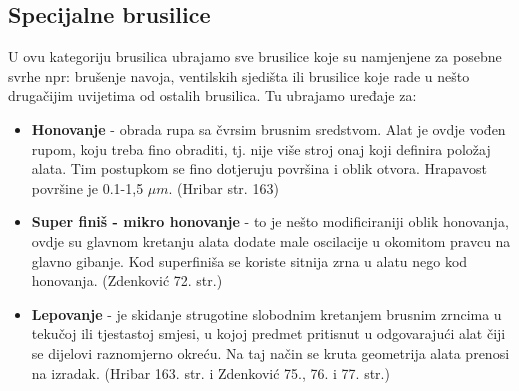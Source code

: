 \documentclass[a4paper,12pt]{article}
\numberwithin{figure}{section}
\begin{document}
\subsection{Specijalne brusilice}
U ovu kategoriju brusilica ubrajamo sve brusilice koje su namjenjene za posebne svrhe npr: brušenje navoja, ventilskih sjedišta ili brusilice koje rade u nešto drugačijim uvijetima od ostalih brusilica. Tu ubrajamo uređaje za:
\begin{itemize}
\item \textbf{Honovanje} - obrada rupa sa čvrsim brusnim sredstvom. Alat je ovdje vođen rupom, koju treba fino obraditi, tj. nije više stroj onaj koji definira položaj alata. Tim postupkom se fino dotjeruju površina i oblik otvora. Hrapavost površine je 0.1-1,5 $\mu m$. (Hribar str. 163)
\item \textbf{Super finiš - mikro honovanje} - to je nešto modificiraniji oblik honovanja, ovdje su glavnom kretanju alata dodate male oscilacije u okomitom pravcu na glavno gibanje. Kod superfiniša se koriste sitnija zrna u alatu nego kod honovanja. (Zdenković 72. str.)
\item \textbf{Lepovanje} - je skidanje strugotine slobodnim kretanjem brusnim zrncima u tekučoj ili tjestastoj smjesi, u kojoj predmet pritisnut u odgovarajući alat čiji se dijelovi raznomjerno okreću. Na taj način se kruta geometrija alata prenosi na izradak. (Hribar 163. str. i Zdenković 75., 76. i 77. str.)
\end{itemize}
\end{document}
